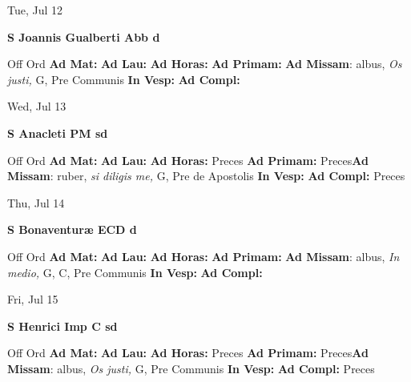 \documentclass[10pt]{memoir}
\begin{document}
\begin{center}
\begin{minipage}{3.5in}
\vspace{2em}
\begin{center}Tue, Jul 12
\end{center}
\textbf{ \large S Joannis Gualberti Abb
\textnormal{\normalsize d}}

\begin{justify}Off Ord
\textbf{Ad Mat: }
\textbf{Ad Lau: }
\textbf{Ad Horas: }
\textbf{Ad Primam: }\textbf{Ad Missam}: albus, \textit{Os justi,} G, Pre Communis
\textbf{In Vesp: }
\textbf{Ad Compl: }
\end{justify}
\end{minipage}
\end{center}

\begin{center}
\begin{minipage}{3.5in}
\vspace{2em}
\begin{center}Wed, Jul 13
\end{center}
\textbf{ \large S Anacleti PM
\textnormal{\normalsize sd}}

\begin{justify}Off Ord
\textbf{Ad Mat: }
\textbf{Ad Lau: }
\textbf{Ad Horas: }Preces
\textbf{Ad Primam: }Preces\textbf{Ad Missam}: ruber, \textit{si diligis me,} G, Pre de Apostolis
\textbf{In Vesp: }
\textbf{Ad Compl: }Preces
\end{justify}
\end{minipage}
\end{center}

\begin{center}
\begin{minipage}{3.5in}
\vspace{2em}
\begin{center}Thu, Jul 14
\end{center}
\textbf{ \large S Bonaventuræ ECD
\textnormal{\normalsize d}}

\begin{justify}Off Ord
\textbf{Ad Mat: }
\textbf{Ad Lau: }
\textbf{Ad Horas: }
\textbf{Ad Primam: }\textbf{Ad Missam}: albus, \textit{In medio,} G, C, Pre Communis
\textbf{In Vesp: }
\textbf{Ad Compl: }
\end{justify}
\end{minipage}
\end{center}

\begin{center}
\begin{minipage}{3.5in}
\vspace{2em}
\begin{center}Fri, Jul 15
\end{center}
\textbf{ \large S Henrici Imp C
\textnormal{\normalsize sd}}

\begin{justify}Off Ord
\textbf{Ad Mat: }
\textbf{Ad Lau: }
\textbf{Ad Horas: }Preces
\textbf{Ad Primam: }Preces\textbf{Ad Missam}: albus, \textit{Os justi,} G, Pre Communis
\textbf{In Vesp: }
\textbf{Ad Compl: }Preces
\end{justify}
\end{minipage}
\end{center}
\end{document}
